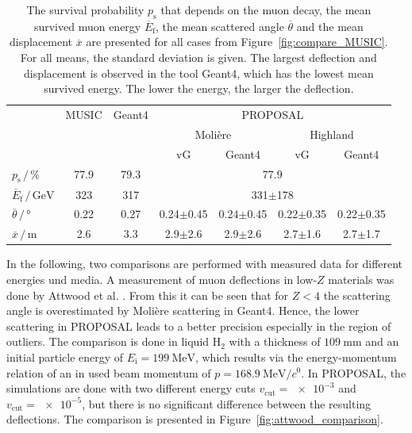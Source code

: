 \documentclass[pdflatex, sn-mathphys]{sn-jnl}%
\theoremstyle{thmstyleone}%
\theoremstyle{thmstyletwo}%
\theoremstyle{thmstylethree}%
\begin{document}
\begin{table}
    \small
    \centering
    \caption{The survival probability $p_{\text{s}}$ that depends on the muon decay, the mean survived muon 
    energy $\overline{E}_{\text{f}}$, the mean scattered angle $\overline{\theta}$ 
    and the mean displacement $\overline{x}$ are presented for all cases from 
    Figure~\ref{fig:compare_MUSIC}. For all means, the standard deviation is given.
    The largest deflection and displacement is observed in the tool Geant4, which has the lowest mean survived energy. The lower the energy, the larger the deflection.}
    \begin{tabular}{l|cc|cccc}
        \toprule
        & MUSIC & Geant4 & \multicolumn{4}{c}{PROPOSAL} \\
        &  & & \multicolumn{2}{c}{Molière} & \multicolumn{2}{c}{Highland} \\
        &  &  & vG & Geant4 & vG & Geant4 \\
        \midrule
        $p_{\text{s}}\,/\,\si{\percent}$ & 77.9 & 79.3 &  \multicolumn{4}{c}{77.9}\\
        $\overline{E}_{\text{f}}\,/\,\si{\giga\electronvolt}$ & 323 & 317 & \multicolumn{4}{c}{331$\pm$178} \\
        $\overline{\theta}\,/\,\si{\degree}$ & 0.22 & 0.27 & 0.24$\pm$0.45 & 0.24$\pm$0.45 & 0.22$\pm$0.35 & 0.22$\pm$0.35   \\
        $\overline{x}\,/\,\si{\meter}$ & 2.6 & 3.3 & 2.9$\pm$2.6 & 2.9$\pm$2.6 & 2.7$\pm$1.6 & 2.7$\pm$1.7  \\
     \bottomrule
    \end{tabular}
    \label{tab:compare_MUSIC}
\end{table}

In the following, two comparisons are performed with measured data for 
different energies und media.
A measurement of muon deflections in low-$Z$ materials was done by Attwood et al. \cite{attwood_2006}. 
From this it can be seen that for $Z < 4$ the scattering angle is overestimated 
by Molière scattering in Geant4. Hence, the lower scattering in PROPOSAL leads 
to a better precision especially in the region of outliers. The comparison is 
done in liquid $\text{H}_2$ with a thickness of $\SI{109}{\milli\meter}$ and an 
initial particle energy of $E_{\mathrm{i}} = \SI{199}{\mega\electronvolt}$, which 
results via the energy-momentum relation of an in \cite{attwood_2006} used beam momentum 
of $p = \SI[per-mode=symbol]{168.9}{\mega\electronvolt\per\clight}$. 
In PROPOSAL, the simulations are done with two different energy cuts $v_{\mathrm{cut}} = \num{e-3}$ and $v_{\mathrm{cut}} = \num{e-5}$, 
but there is no significant difference between the resulting deflections.
The comparison is presented in Figure~\ref{fig:attwood_comparison}.
\end{document}
